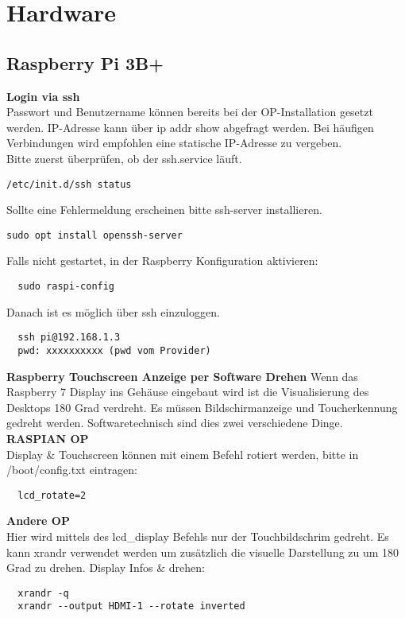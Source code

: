 \section{Hardware}

\subsection{Raspberry Pi 3B+} \label{RefRaspi}
\textbf{Login via ssh}\\
Passwort und Benutzername können bereits bei der OP-Installation gesetzt werden. IP-Adresse kann über ip addr show abgefragt werden. Bei häufigen Verbindungen wird empfohlen eine statische IP-Adresse zu vergeben.\\

Bitte zuerst überprüfen, ob der ssh.service läuft.
\begin{verbatim}
/etc/init.d/ssh status
\end{verbatim}
Sollte eine Fehlermeldung erscheinen bitte ssh-server installieren.
\begin{verbatim}
sudo opt install openssh-server
\end{verbatim}
Falls nicht gestartet, in der Raspberry Konfiguration aktivieren:
\begin{verbatim}
  sudo raspi-config
\end{verbatim}
Danach ist es möglich über ssh einzuloggen.
\begin{verbatim}
  ssh pi@192.168.1.3
  pwd: xxxxxxxxxx (pwd vom Provider)
\end{verbatim}

\textbf{Raspberry Touchscreen Anzeige per Software Drehen}
Wenn das Raspberry 7\grqq{} Display ins Gehäuse eingebaut wird ist die 
Visualisierung des Desktops 180 Grad verdreht. Es müssen Bildschirmanzeige 
und Toucherkennung gedreht werden. Softwaretechnisch sind dies zwei verschiedene 
Dinge.\\

\textbf{RASPIAN OP}\\
Display \& Touchscreen können mit einem Befehl rotiert werden, 
bitte in /boot/config.txt eintragen:
\begin{verbatim}
  lcd_rotate=2
\end{verbatim}

\textbf{Andere OP}\\
Hier wird mittels des lcd\_display Befehls nur der Touchbildschrim 
gedreht. Es kann xrandr verwendet werden um zusätzlich die visuelle Darstellung zu 
um 180 Grad zu drehen. Display Infos \& drehen:
\begin{verbatim}
  xrandr -q
  xrandr --output HDMI-1 --rotate inverted
\end{verbatim}


